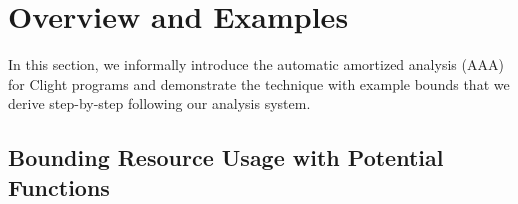 \documentclass[nocopyrightspace,preprint]{sigplanconf}
\newcommand{\ifshort}[2]{\ifx\fullversion\undefined{#1}\else{#2}\fi}
\newcommand{\sectskip}[0]{\ifshort{\vspace{-3pt}}{}}
\newcommand{\aftersectskip}[0]{\ifshort{\vspace{-1pt}}{}}
\newcommand{\pref}[1]{\prettyref{#1}}
\begin{document}
%
%

\sectskip
\section{Overview and Examples}
\aftersectskip

In this section, we informally introduce the automatic amortized
analysis (AAA) for Clight programs and demonstrate the technique with
example bounds that we derive step-by-step following our analysis
system.


\subsection{Bounding Resource Usage with Potential Functions}
\end{document}
